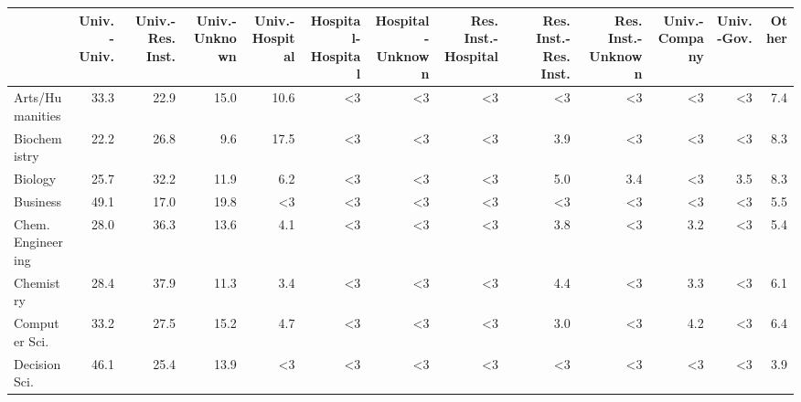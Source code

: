 \begin{tabular}{lrrrrrrrrrrrr}
\toprule
{} &  Univ.-Univ. &  Univ.-Res. Inst. &  Univ.-Unknown &  Univ.-Hospital &  Hospital-Hospital &  Hospital-Unknown &  Res. Inst.-Hospital &  Res. Inst.-Res. Inst. &  Res. Inst.-Unknown &  Univ.-Company &  Univ.-Gov. &  Other \\
\midrule
Arts/Humanities   &         33.3 &              22.9 &           15.0 &            10.6 &                 <3 &                <3 &                   <3 &                     <3 &                  <3 &             <3 &          <3 &    7.4 \\
Biochemistry      &         22.2 &              26.8 &            9.6 &            17.5 &                 <3 &                <3 &                   <3 &                    3.9 &                  <3 &             <3 &          <3 &    8.3 \\
Biology           &         25.7 &              32.2 &           11.9 &             6.2 &                 <3 &                <3 &                   <3 &                    5.0 &                 3.4 &             <3 &         3.5 &    8.3 \\
Business          &         49.1 &              17.0 &           19.8 &              <3 &                 <3 &                <3 &                   <3 &                     <3 &                  <3 &             <3 &          <3 &    5.5 \\
Chem. Engineering &         28.0 &              36.3 &           13.6 &             4.1 &                 <3 &                <3 &                   <3 &                    3.8 &                  <3 &            3.2 &          <3 &    5.4 \\
Chemistry         &         28.4 &              37.9 &           11.3 &             3.4 &                 <3 &                <3 &                   <3 &                    4.4 &                  <3 &            3.3 &          <3 &    6.1 \\
Computer Sci.     &         33.2 &              27.5 &           15.2 &             4.7 &                 <3 &                <3 &                   <3 &                    3.0 &                  <3 &            4.2 &          <3 &    6.4 \\
Decision Sci.     &         46.1 &              25.4 &           13.9 &              <3 &                 <3 &                <3 &                   <3 &                     <3 &                  <3 &             <3 &          <3 &    3.9 \\

\end{tabular}
